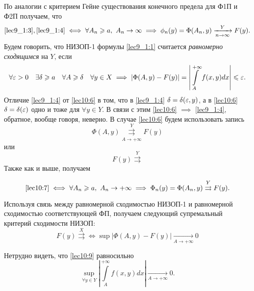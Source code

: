 \documentclass[../../main.tex]{subfiles}
\begin{document}
По аналогии с критерием Гейне существования конечного предела для Ф1П и Ф2П 
получаем, что 
\[\eqref{lec9_1:3}, \eqref{lec9_1:4} \iff \forall A_n \ge 
a,\ A_n \to \infty \implies \phi_n(y) =\Phi(A_n,y) \xrightarrow[n\rightarrow 
\infty]{Y}F(y).\]
Будем говорить, что НИЗОП-1 формулы \eqref{lec9_1:1}  считается 
\emph{равномерно сходящимся} на $Y$, если
\begin{equation}
\label{lec10:6}
\forall \eps > 0\quad \exists \delta \ge a\quad \forall A \ge \delta\quad 
\forall y\in X 
\implies \left| \Phi(A,y) - F(y) \right| = \left| \int\limits_A^{+\infty} 
f(x,y) dx \right| \le \eps.
\end{equation}
Отличие \eqref{lec9_1:4} от \eqref{lec10:6} в том, что в \eqref{lec9_1:4} 
$\delta = 
\delta(\eps,y)$, а в \eqref{lec10:6} $\delta = \delta(\eps)$ одно и тоже для
$\forall y \in Y$. В связи с этим \eqref{lec10:6} $\implies$ \eqref{lec9_1:4}, 
обратное, вообще говоря, неверно. 
В случае \eqref{lec10:6} будем использовать запись \begin{equation}
\label{lec10:7}
\Phi(A,y)\overset{Y}{\underset{A \to +\infty}{\rightrightarrows}}F(y)
\end{equation}
или 
\begin{equation}
F(y)\overset{Y}{\rightrightarrows}
\end{equation}
Также как и выше, получаем 

\begin{thm}
\begin{equation}
\label{lec10:8}
 \eqref{lec10:7} \iff \forall A_n \ge a,\ A_n\rightarrow +\infty \implies 
 \Phi_n(y) = \Phi(A_n,y) \overset{Y}\rightrightarrows F(y).
\end{equation}
\end{thm}
Используя связь между равномерной сходимостью НИЗОП-1 и равномерной 
сходимостью соответствующей ФП, получаем следующий супремальный критерий 
сходимости НИЗОП:
\begin{equation}
\label{lec10:9}
F(y)\overset{X} \rightrightarrows \iff \sup\left|\Phi(A , y) - F(y) \right| 
\underset{A \to + \infty}\to 0 \end{equation}

Нетрудно видеть, что \eqref{lec10:9} равносильно
\begin{equation}
\label{lec10:10} \underset{\forall y \in 
Y}\sup\left|\int\limits_A^{+\infty} f(x,y)dx\right| \underset{A \to + \infty} 
\to 0. \end{equation}
\end{document}
